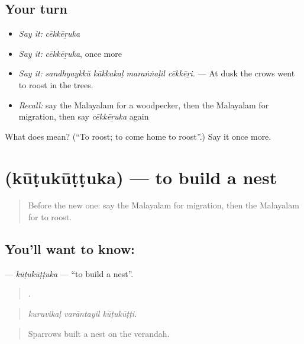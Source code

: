 \subsection*{Your turn}
\begin{itemize}
\raggedright
  \item \emph{Say it:} \emph{cēkkēṟuka}
  \item \emph{Say it:} \emph{cēkkēṟuka}, once more
  \item \emph{Say it:} \emph{sandhyaykkŭ kākkakaḷ maraṅṅaḷil cēkkēṟi.} — At dusk the crows went to roost in the trees.
  \item \emph{Recall:} say the Malayalam for a woodpecker, then the Malayalam for migration, then say \emph{cēkkēṟuka} again
\end{itemize}

\begin{tcolorbox}[breakable,colback=teal!4,colframe=teal!35!black,title={Before you move on}]
What does  mean? (\textquotedblleft{}To roost; to come home to roost\textquotedblright{}.) Say it once more.
\end{tcolorbox}
\section[\texorpdfstring{\ml{കൂടുകൂട്ടുക} (kūṭukūṭṭuka)}{കൂടുകൂട്ടുക (kūṭukūṭṭuka)}]{ (kūṭukūṭṭuka) — to build a nest}

\label{lesson:ML-C500-kutukuttuka}



\begin{quote}
Before the new one: say the Malayalam for migration, then the Malayalam for to roost.
\end{quote}

\subsection*{You'll want to know: }
\textbf{} — \emph{kūṭukūṭṭuka} — \textquotedblleft{}to build a nest\textquotedblright{}.

\begin{quote}
  .
\end{quote}

\begin{quote}
\emph{kuruvikaḷ varāntayil kūṭukūṭṭi.}
\end{quote}

\begin{quote}
Sparrows built a nest on the verandah.
\end{quote}

